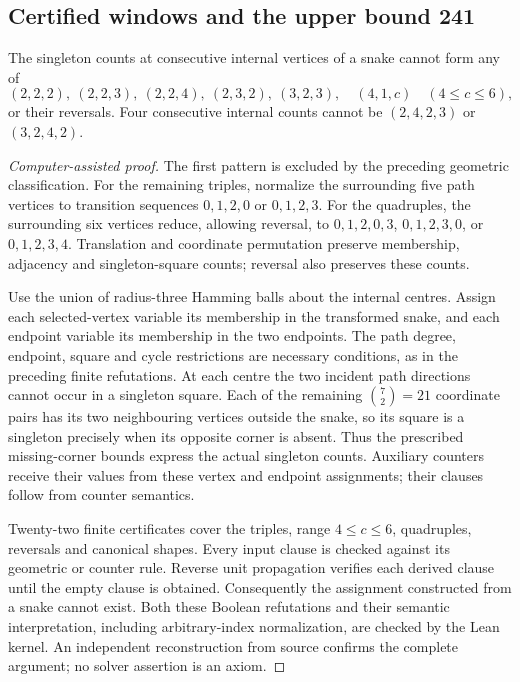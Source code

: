 \subsection{Certified windows and the upper bound 241}
\begin{lemma}\label{lem:windows241}
The singleton counts at consecutive internal vertices of a snake cannot form
any of
\[
(2,2,2),\ (2,2,3),\ (2,2,4),\ (2,3,2),\ (3,2,3),
\quad (4,1,c)\quad(4\le c\le6),
\]
or their reversals. Four consecutive internal counts cannot be
$(2,4,2,3)$ or $(3,2,4,2)$.
\end{lemma}
\begin{proof}[Computer-assisted proof]
The first pattern is excluded by the preceding geometric classification.
For the remaining triples, normalize the surrounding five path vertices
to transition sequences $0,1,2,0$ or $0,1,2,3$. For the quadruples,
the surrounding six vertices reduce, allowing reversal, to
$0,1,2,0,3$, $0,1,2,3,0$, or $0,1,2,3,4$.
Translation and coordinate permutation preserve membership, adjacency and
singleton-square counts; reversal also preserves these counts.

Use the union of radius-three Hamming balls about the internal centres.
Assign each selected-vertex variable its membership in the transformed snake,
and each endpoint variable its membership in the two endpoints. The path
degree, endpoint, square and cycle restrictions are necessary conditions,
as in the preceding finite refutations. At each centre the two incident
path directions cannot occur in a singleton square. Each of the remaining
$\binom72=21$ coordinate pairs has its two neighbouring vertices outside the
snake, so its square is a singleton precisely when its opposite corner is
absent. Thus the prescribed missing-corner bounds express the actual
singleton counts. Auxiliary counters receive their values from these
vertex and endpoint assignments; their clauses follow from counter semantics.

Twenty-two finite certificates cover the triples, range $4\le c\le6$,
quadruples, reversals and canonical shapes. Every input clause is checked
against its geometric or counter rule. Reverse unit propagation verifies
each derived clause until the empty clause is obtained. Consequently the
assignment constructed from a snake cannot exist. Both these Boolean
refutations and their semantic interpretation, including arbitrary-index
normalization, are checked by the Lean kernel. An independent reconstruction
from source confirms the complete argument; no solver assertion is an axiom.
\end{proof}

